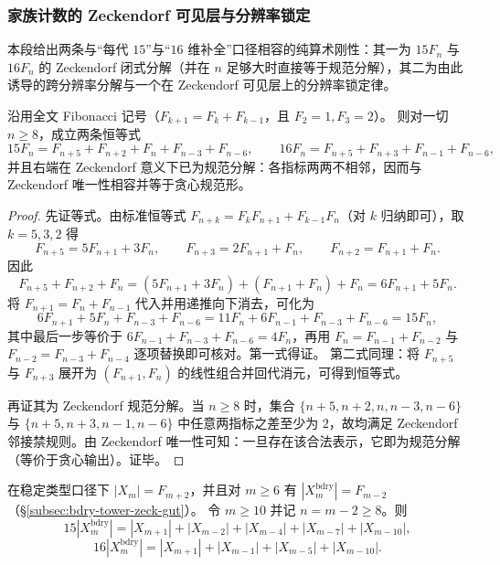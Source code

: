 \subsubsection{家族计数的 Zeckendorf 可见层与分辨率锁定}\label{subsubsec:conclusion-zeckendorf-15-16-family-lock}

本段给出两条与“每代 \(15\)”与“\(16\) 维补全”口径相容的纯算术刚性：其一为 \(15F_n\) 与 \(16F_n\) 的 Zeckendorf 闭式分解（并在 \(n\) 足够大时直接等于规范分解），其二为由此诱导的跨分辨率分解与一个在 Zeckendorf 可见层上的分辨率锁定律。

\begin{theorem}\label{thm:conclusion-zeckendorf-15-16-closed}
沿用全文 Fibonacci 记号（\(F_{k+1}=F_k+F_{k-1}\)，且 \(F_2=1,F_3=2\)）。
则对一切 \(n\ge 8\)，成立两条恒等式
\[
15F_n=F_{n+5}+F_{n+2}+F_{n}+F_{n-3}+F_{n-6},
\qquad
16F_n=F_{n+5}+F_{n+3}+F_{n-1}+F_{n-6},
\]
并且右端在 Zeckendorf 意义下已为规范分解：各指标两两不相邻，因而与 Zeckendorf 唯一性相容并等于贪心规范形。
\end{theorem}

\begin{proof}
先证等式。由标准恒等式 \(F_{n+k}=F_kF_{n+1}+F_{k-1}F_n\)（对 \(k\) 归纳即可），取 \(k=5,3,2\) 得
\[
F_{n+5}=5F_{n+1}+3F_n,\qquad
F_{n+3}=2F_{n+1}+F_n,\qquad
F_{n+2}=F_{n+1}+F_n.
\]
因此
\[
F_{n+5}+F_{n+2}+F_n
=(5F_{n+1}+3F_n)+(F_{n+1}+F_n)+F_n
=6F_{n+1}+5F_n.
\]
将 \(F_{n+1}=F_n+F_{n-1}\) 代入并用递推向下消去，可化为
\[
6F_{n+1}+5F_n+F_{n-3}+F_{n-6}
=11F_n+6F_{n-1}+F_{n-3}+F_{n-6}
=15F_n,
\]
其中最后一步等价于 \(6F_{n-1}+F_{n-3}+F_{n-6}=4F_n\)，再用 \(F_n=F_{n-1}+F_{n-2}\) 与 \(F_{n-2}=F_{n-3}+F_{n-4}\) 逐项替换即可核对。第一式得证。
第二式同理：将 \(F_{n+5}\) 与 \(F_{n+3}\) 展开为 \((F_{n+1},F_n)\) 的线性组合并回代消元，可得到恒等式。

再证其为 Zeckendorf 规范分解。当 \(n\ge 8\) 时，集合
\(\{n+5,n+2,n,n-3,n-6\}\) 与 \(\{n+5,n+3,n-1,n-6\}\) 中任意两指标之差至少为 \(2\)，故均满足 Zeckendorf 邻接禁规则。由 Zeckendorf 唯一性可知：一旦存在该合法表示，它即为规范分解（等价于贪心输出）。证毕。
\end{proof}

\begin{corollary}\label{cor:conclusion-zeckendorf-15-16-cross-resolution}
在稳定类型口径下 \(|X_m|=F_{m+2}\)，并且对 \(m\ge 6\) 有 \(|X_m^{\mathrm{bdry}}|=F_{m-2}\)（\S\ref{subsec:bdry-tower-zeck-gut}）。
令 \(m\ge 10\) 并记 \(n=m-2\ge 8\)。则
\[
15|X_m^{\mathrm{bdry}}|
=|X_{m+1}|+|X_{m-2}|+|X_{m-4}|+|X_{m-7}|+|X_{m-10}|,
\]
\[
16|X_m^{\mathrm{bdry}}|
=|X_{m+1}|+|X_{m-1}|+|X_{m-5}|+|X_{m-10}|.
\]
\end{corollary}

